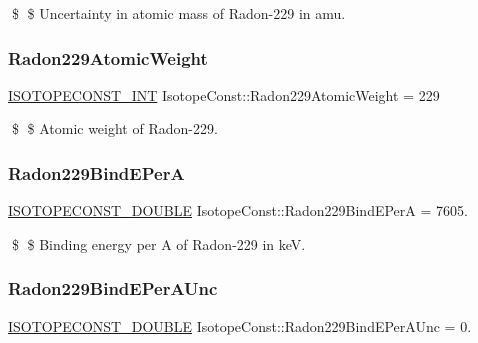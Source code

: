 \$ \$ Uncertainty in atomic mass of Radon-\/229 in amu. \mbox{\label{group___isotope_const-_radon-_rn229_ga999b5aa80084aafd49f29608b0b76104}} 
\subsubsection{\texorpdfstring{Radon229\+Atomic\+Weight}{Radon229AtomicWeight}}
{\footnotesize\ttfamily \mbox{\hyperlink{group___isotope_const-_macros_ga5f18360b3e99483a35c32d789e62621c}{I\+S\+O\+T\+O\+P\+E\+C\+O\+N\+S\+T\+\_\+\+I\+NT}} Isotope\+Const\+::\+Radon229\+Atomic\+Weight = 229}

\$ \$ Atomic weight of Radon-\/229. \mbox{\label{group___isotope_const-_radon-_rn229_gab9a7cb63756652c182de3aaf0012ff81}} 
\subsubsection{\texorpdfstring{Radon229\+Bind\+E\+PerA}{Radon229BindEPerA}}
{\footnotesize\ttfamily \mbox{\hyperlink{group___isotope_const-_macros_ga8f45a7272ce02c0b4c65c44636ed719a}{I\+S\+O\+T\+O\+P\+E\+C\+O\+N\+S\+T\+\_\+\+D\+O\+U\+B\+LE}} Isotope\+Const\+::\+Radon229\+Bind\+E\+PerA = 7605.}

\$ \$ Binding energy per A of Radon-\/229 in keV. \mbox{\label{group___isotope_const-_radon-_rn229_ga2f28cf1883629ee9f20fd72c17f5d88b}} 
\subsubsection{\texorpdfstring{Radon229\+Bind\+E\+Per\+A\+Unc}{Radon229BindEPerAUnc}}
{\footnotesize\ttfamily \mbox{\hyperlink{group___isotope_const-_macros_ga8f45a7272ce02c0b4c65c44636ed719a}{I\+S\+O\+T\+O\+P\+E\+C\+O\+N\+S\+T\+\_\+\+D\+O\+U\+B\+LE}} Isotope\+Const\+::\+Radon229\+Bind\+E\+Per\+A\+Unc = 0.}

